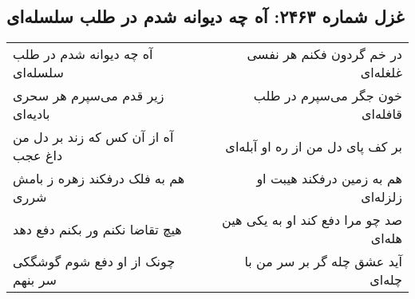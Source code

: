 \begin{center}
\section*{غزل شماره ۲۴۶۳: آه چه دیوانه شدم در طلب سلسله‌ای}
\label{sec:2463}
\begin{longtable}{l p{0.5cm} r}
آه چه دیوانه شدم در طلب سلسله‌ای
&&
در خم گردون فکنم هر نفسی غلغله‌ای
\\
زیر قدم می‌سپرم هر سحری بادیه‌ای
&&
خون جگر می‌سپرم در طلب قافله‌ای
\\
آه از آن کس که زند بر دل من داغ عجب
&&
بر کف پای دل من از ره او آبله‌ای
\\
هم به فلک درفکند زهره ز بامش شرری
&&
هم به زمین درفکند هیبت او زلزله‌ای
\\
هیچ تقاضا نکنم ور بکنم دفع دهد
&&
صد چو مرا دفع کند او به یکی هین هله‌ای
\\
چونک از او دفع شوم گوشگکی سر بنهم
&&
آید عشق چله گر بر سر من با چله‌ای
\\
\end{longtable}
\end{center}
